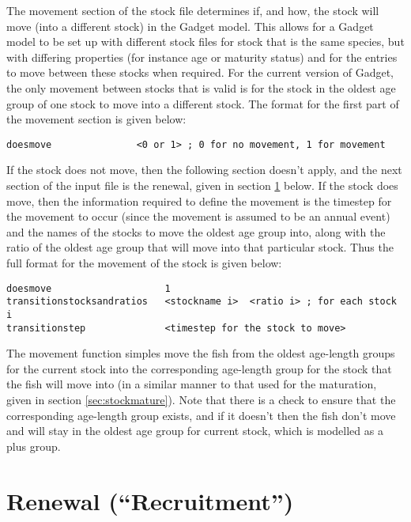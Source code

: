 \documentclass[]{book}
\begin{document}
The movement section of the stock file determines if, and how, the stock
will move (into a different stock) in the Gadget model. This allows for
a Gadget model to be set up with different stock files for stock that is
the same species, but with differing properties (for instance age or
maturity status) and for the entries to move between these stocks when
required. For the current version of Gadget, the only movement between
stocks that is valid is for the stock in the oldest age group of one
stock to move into a different stock. The format for the first part of
the movement section is given below:

\begin{verbatim}
doesmove               <0 or 1> ; 0 for no movement, 1 for movement
\end{verbatim}

If the stock does not move, then the following section doesn't apply,
and the next section of the input file is the renewal, given in
section \ref{sec:stockrenew} below. If the stock does move, then the
information required to define the movement is the timestep for the
movement to occur (since the movement is assumed to be an annual event)
and the names of the stocks to move the oldest age group into, along
with the ratio of the oldest age group that will move into that
particular stock. Thus the full format for the movement of the stock is
given below:

\begin{verbatim}
doesmove                    1
transitionstocksandratios   <stockname i>  <ratio i> ; for each stock i
transitionstep              <timestep for the stock to move>
\end{verbatim}

The movement function simples move the fish from the oldest age-length
groups for the current stock into the corresponding age-length group for
the stock that the fish will move into (in a similar manner to that used
for the maturation, given in
section \ref{sec:stockmature}). Note that there is a check to ensure that
the corresponding age-length group exists, and if it doesn't then the
fish don't move and will stay in the oldest age group for current stock,
which is modelled as a plus group.

\hypertarget{sec:stockrenew}{%
\section{Renewal (``Recruitment'')}\label{sec:stockrenew}}
\end{document}
